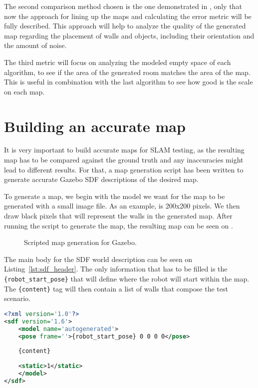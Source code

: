 The second comparison method chosen is the one demonstrated in \cite{santos2013evaluation}, only that now the approach for lining up the maps and calculating the error metric will be fully described. This approach will help to analyze the quality of the generated map regarding the placement of walls and objects, including their orientation and the amount of noise.

The third metric will focus on analyzing the modeled empty space of each algorithm, to see if the area of the generated room matches the area of the map. This is useful in combination with the last algorithm to see how good is the scale on each map.

\section{Building an accurate map}

It is very important to build accurate maps for SLAM testing, as the resulting map has to be compared against the ground truth and any inaccuracies might lead to different results. For that, a map generation script has been written to generate accurate Gazebo SDF descriptions of the desired map.

To generate a map, we begin with the model we want for the map to be generated with a small image file. As an example,  is 200x200 pixels. We then draw black pixels that will represent the walls in the generated map. After running the script to generate the map, the resulting map can be seen on .

\begin{figure}[!ht]
     \centering
     \hfill
     \caption{Scripted map generation for Gazebo.}
     \label{fig:map_generation_script}
\end{figure}

The main body for the SDF world description can be seen on Listing~\ref{lst:sdf_header}. The only information that has to be filled is the \texttt{\{robot\_start\_pose\}} that will define where the robot will start within the map. The \texttt{\{content\}} tag will then contain a list of walls that compose the test scenario.

\begin{lstlisting}[caption={SDF Header.},label={lst:sdf_header},language=XML]
<?xml version='1.0'?>
<sdf version='1.6'>
    <model name='autogenerated'>
    <pose frame=''>{robot_start_pose} 0 0 0 0</pose>
    
    {content}
    
    <static>1</static>
    </model>
</sdf>
\end{lstlisting} \label{lst:1}


